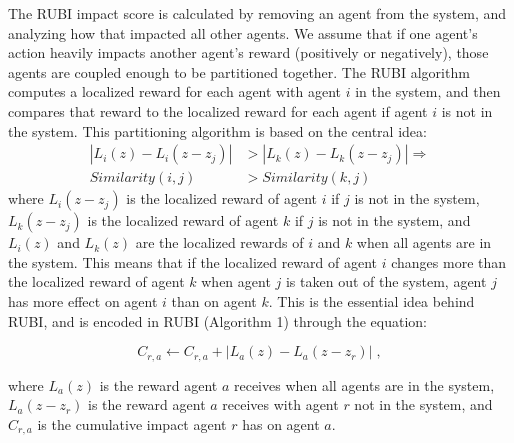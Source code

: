 \documentclass[smallcondensed]{svjour3}
\begin{document}

The RUBI impact score is calculated by removing an agent from the system, and analyzing how that impacted all other agents. We assume that if one agent's action heavily impacts another agent's reward (positively or negatively), those agents are coupled enough to be partitioned together. The RUBI algorithm computes a localized reward for each agent with agent $i$ in the system, and then compares that reward to the localized reward for each agent if agent $i$ is not in the system. This partitioning algorithm is based on the central idea:
%
\begin{align}
|L_i(z) - L_i(z-z_j)| &> |L_k(z) - L_k(z-z_j)|   \Rightarrow \\
Similarity(i,j) &> Similarity(k,j) \nonumber
\end{align}
%
where $L_i(z-z_j)$ is the localized reward of agent $i$ if $j$ is not in the system, $L_k(z-z_j)$ is the localized reward of agent $k$ if $j$ is not in the system, and $L_i(z)$ and $L_k(z)$ are the localized rewards of $i$ and $k$ when all agents are in the system. This means that if the localized reward of agent $i$ changes more than the localized reward of agent $k$ when agent $j$ is taken out of the system, agent $j$ has more effect on agent $i$ than on agent $k$. This is the essential idea behind RUBI, and is encoded in RUBI (Algorithm 1) through the equation:

\begin{equation} \label{eq:RUBI Update}
C_{r,a} \leftarrow C_{r,a} + |L_a(z) - L_a(z-z_r) | \;,
\end{equation}

where $L_a(z)$ is the reward agent $a$ receives when all agents are in the system, $L_a(z-z_r)$ is the reward agent $a$ receives with agent $r$ not in the system, and $C_{r,a}$ is the cumulative impact agent $r$ has on agent $a$.
\end{document}
